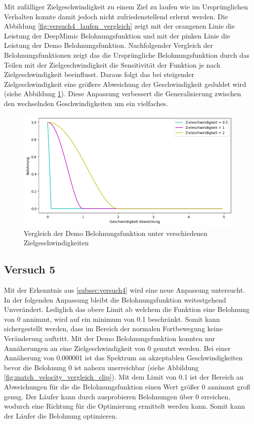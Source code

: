Mit zufälliger Zielgeschwindigkeit zu einem Ziel zu laufen wie im Ursprünglichen Verhalten konnte damit jedoch nicht zufriedenstellend erlernt werden. Die Abbildung \ref{fig:versuch4_laufen_vergleich} zeigt mit der orangenen Linie die Leistung der DeepMimic Belohnungsfunktion und mit der pinken Linie die Leistung der Demo Belohnungsfunktion. Nachfolgender Vergleich der Belohnungsfunktionen zeigt das die Ursprüngliche Belohnungsfunktion durch das Teilen mit der Zielgeschwindigkeit die Sensitivität der Funktion je nach Zielgeschwindigkeit beeinflusst. Daraus folgt das bei steigender Zielgeschwindigkeit eine größere Abweichung der Geschwindigkeit geduldet wird (siehe Abbildung \ref{fig:match_velocity_demo_vergleich}). Diese Anpassung verbessert die Generalisierung zwischen den wechselnden Geschwindigkeiten um ein vielfaches.

\begin{figure}[H]
  \centering  
  \includegraphics[scale=0.5]{img/match_velocity_demo_vergleich}
  \caption{Vergleich der Demo Belohnungsfunktion unter verschiedenen Zielgeschwindigkeiten}
  \label{fig:match_velocity_demo_vergleich}
\end{figure}

\subsection{Versuch 5}
Mit der Erkenntnis aus \ref{subsec:versuch4} wird eine neue Anpassung untersucht. In der folgenden Anpassung bleibt die Belohnungsfunktion weitestgehend Unverändert. Lediglich das obere Limit ab welchem die Funktion eine Belohnung von 0 annimmt, wird auf ein minimum von 0.1 beschränkt. Somit kann sichergestellt werden, dass im Bereich der normalen Fortbewegung keine Veränderung auftritt. Mit der Demo Belohnungsfunktion konnten nur Annäherungen an eine Zielgeschwindigkeit von 0 genutzt werden. Bei einer Annäherung von 0.000001 ist das Spektrum an akzeptablen Geschwindigkeiten bevor die Belohnung 0 ist nahezu unerreichbar (siehe Abbildung \ref{fig:match_velocity_vergleich_clip}). Mit dem Limit von 0.1 ist der Bereich an Abweichungen für die die Belohnungsfunktion einen Wert größer 0 annimmt groß genug. Der Läufer kann durch ausprobieren Belohnungen über 0 erreichen, wodurch eine Richtung für die Optimierung ermittelt werden kann. Somit kann der Läufer die Belohnung optimieren.\\

